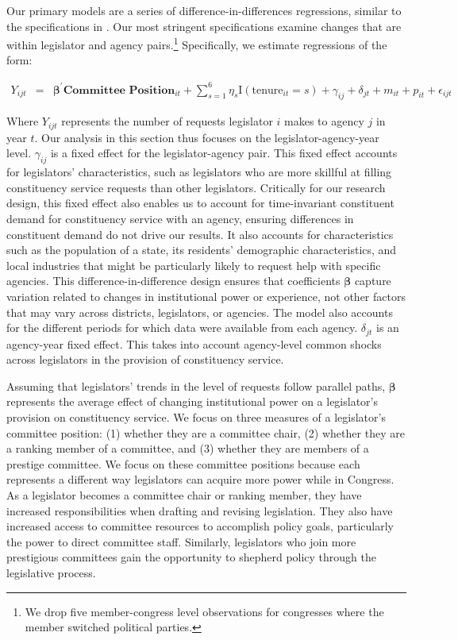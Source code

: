 \documentclass[12pt]{article}
\begin{document}
{ Our primary models are a series of difference-in-differences regressions, similar to the specifications in \cite{BerryFowler2016}. Our most stringent specifications examine changes that are within legislator and agency pairs.\footnote{We drop five member-congress level observations for congresses where the member switched political parties.} Specifically, we estimate regressions of the form: 

\begin{eqnarray}
Y_{ijt} & = & \boldsymbol{\beta}^{'} \textbf{Committee Position}_{it}  + \sum_{s = 1}^{6} \eta_{s} \text{I}\left(\text{tenure}_{it} = s\right) + \gamma_{ij} + \delta_{jt} + m_{it} + p_{it} + \epsilon_{ijt} \label{e:diff1}
\end{eqnarray}

Where $Y_{ijt}$ represents the number of requests legislator $i$ makes to agency $j$ in year $t$. Our analysis in this section thus focuses on the legislator-agency-year level. $\gamma_{ij}$ is a fixed effect for the legislator-agency pair. This fixed effect accounts for legislators' characteristics, such as legislators who are more skillful at filling constituency service requests than other legislators. Critically for our research design, this fixed effect also enables us to account for time-invariant constituent demand for constituency service with an agency, ensuring differences in constituent demand do not drive our results. It also accounts for characteristics such as the population of a state, its residents' demographic characteristics, and local industries that might be particularly likely to request help with specific agencies. This difference-in-difference design ensures that coefficients $\boldsymbol{\beta}$ capture variation related to changes in institutional power or experience, not other factors that may vary across districts, legislators, or agencies. The model also accounts for the different periods for which data were available from each agency. $\delta_{jt}$ is an agency-year fixed effect. This takes into account agency-level common shocks across legislators in the provision of constituency service. 

Assuming that legislators' trends in the level of requests follow parallel paths, $\boldsymbol{\beta}$ represents the average effect of changing institutional power on a legislator's provision on constituency service. We focus on three measures of a legislator's committee position: (1) whether they are a committee chair, (2) whether they are a ranking member of a committee, and (3) whether they are members of a prestige committee. We focus on these committee positions because each represents a different way legislators can acquire more power while in Congress. As a legislator becomes a committee chair or ranking member, they have increased responsibilities when drafting and revising legislation. They also have increased access to committee resources to accomplish policy goals, particularly the power to direct committee staff. Similarly, legislators who join more prestigious committees gain the opportunity to shepherd policy through the legislative process.

}
\end{document}

